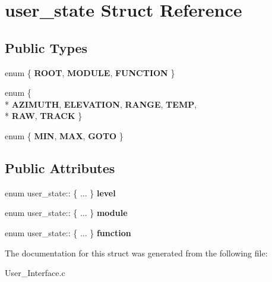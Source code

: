 \hypertarget{structuser__state}{\section{user\+\_\+state Struct Reference}
\label{structuser__state}
}
\subsection*{Public Types}
\begin{DoxyCompactItemize}
\item 
\hypertarget{structuser__state_a13445f2eeffec0beccb7fd02f1703835}{enum \{ {\bfseries R\+O\+O\+T}, 
{\bfseries M\+O\+D\+U\+L\+E}, 
{\bfseries F\+U\+N\+C\+T\+I\+O\+N}
 \}}\label{structuser__state_a13445f2eeffec0beccb7fd02f1703835}

\item 
\hypertarget{structuser__state_a4b64db3f65f81534731b565b49e1a378}{enum \{ \\*
{\bfseries A\+Z\+I\+M\+U\+T\+H}, 
{\bfseries E\+L\+E\+V\+A\+T\+I\+O\+N}, 
{\bfseries R\+A\+N\+G\+E}, 
{\bfseries T\+E\+M\+P}, 
\\*
{\bfseries R\+A\+W}, 
{\bfseries T\+R\+A\+C\+K}
 \}}\label{structuser__state_a4b64db3f65f81534731b565b49e1a378}

\item 
\hypertarget{structuser__state_a060550b5c620a858daef4742baacdcc4}{enum \{ {\bfseries M\+I\+N}, 
{\bfseries M\+A\+X}, 
{\bfseries G\+O\+T\+O}
 \}}\label{structuser__state_a060550b5c620a858daef4742baacdcc4}

\end{DoxyCompactItemize}
\subsection*{Public Attributes}
\begin{DoxyCompactItemize}
\item 
\hypertarget{structuser__state_ab88cbb27c6bacc0a805668209608b117}{enum user\+\_\+state\+:: \{ ... \}  {\bfseries level}}\label{structuser__state_ab88cbb27c6bacc0a805668209608b117}

\item 
\hypertarget{structuser__state_a18908e5f4171efc32b4030355f3e8655}{enum user\+\_\+state\+:: \{ ... \}  {\bfseries module}}\label{structuser__state_a18908e5f4171efc32b4030355f3e8655}

\item 
\hypertarget{structuser__state_a18f154ecdc9f8cda683bf4f9455342df}{enum user\+\_\+state\+:: \{ ... \}  {\bfseries function}}\label{structuser__state_a18f154ecdc9f8cda683bf4f9455342df}

\end{DoxyCompactItemize}


The documentation for this struct was generated from the following file\+:\begin{DoxyCompactItemize}
\item 
User\+\_\+\+Interface.\+c\end{DoxyCompactItemize}

